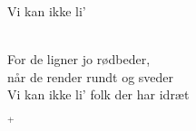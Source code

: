 \begin{song}{Vi kan ikke li'}
 \begin{SBVerse}
    \\
    For de ligner jo rødbeder,\\
    når de render rundt og sveder\\
    Vi kan ikke li' folk der har idræt
  \end{SBVerse}

 \begin{SBVerse}
    $^+$
  \end{SBVerse}
\end{song}